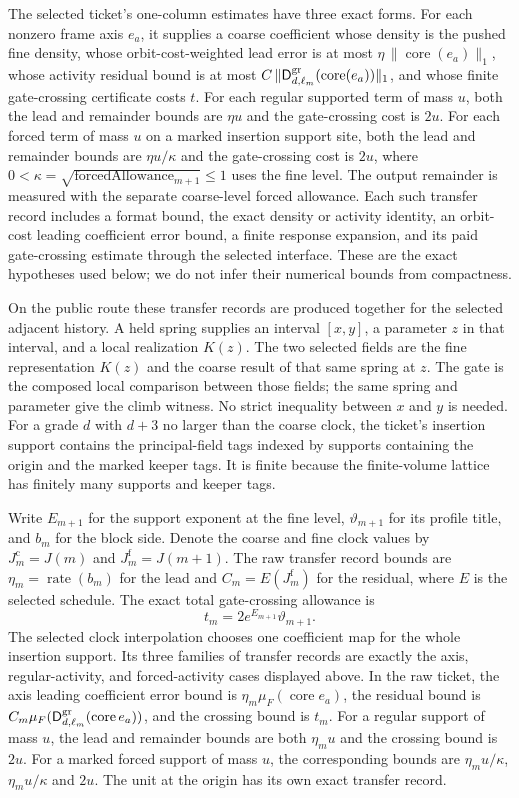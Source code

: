 The selected ticket's one-column estimates have three exact forms. For each nonzero frame axis $e_a$, it supplies a coarse coefficient whose density is the pushed fine density, whose orbit-cost-weighted lead error is at most $\eta\,\|\operatorname{core}(e_a)\|_1$, whose activity residual bound is at most $C\,\|\mathsf D^{\rm gr}_{d,\ell_m}(\operatorname{core}(e_a))\|_1$, and whose finite gate-crossing certificate costs $t$. For each regular supported term of mass $u$, both the lead and remainder bounds are $\eta u$ and the gate-crossing cost is $2u$. For each forced term of mass $u$ on a marked insertion support site, both the lead and remainder bounds are $\eta u/\kappa$ and the gate-crossing cost is $2u$, where $0<\kappa=\sqrt{\text{forcedAllowance}_{m+1}}\leq1$ uses the fine level. The output remainder is measured with the separate coarse-level forced allowance. Each such transfer record includes a format bound, the exact density or activity identity, an orbit-cost leading coefficient error bound, a finite response expansion, and its paid gate-crossing estimate through the selected interface. These are the exact hypotheses used below; we do not infer their numerical bounds from compactness.

On the public route these transfer records are produced together for the selected adjacent history. A held spring supplies an interval $[x,y]$, a parameter $z$ in that interval, and a local realization $K(z)$. The two selected fields are the fine representation $K(z)$ and the coarse result of that same spring at $z$. The gate is the composed local comparison between those fields; the same spring and parameter give the climb witness. No strict inequality between $x$ and $y$ is needed. For a grade $d$ with $d+3$ no larger than the coarse clock, the ticket's insertion support contains the principal-field tags indexed by supports containing the origin and the marked keeper tags. It is finite because the finite-volume lattice has finitely many supports and keeper tags.

Write $E_{m+1}$ for the support exponent at the fine level, $\vartheta_{m+1}$ for its profile title, and $b_m$ for the block side. Denote the coarse and fine clock values by $J_m^{\mathrm c}=J(m)$ and $J_m^{\mathrm f}=J(m+1)$. The raw transfer record bounds are $\eta_m=\operatorname{rate}(b_m)$ for the lead and $C_m=E(J_m^{\mathrm f})$ for the residual, where $E$ is the selected schedule. The exact total gate-crossing allowance is
\[
 t_m=2e^{E_{m+1}}\vartheta_{m+1}.
\]
The selected clock interpolation chooses one coefficient map for the whole insertion support. Its three families of transfer records are exactly the axis, regular-activity, and forced-activity cases displayed above. In the raw ticket, the axis leading coefficient error bound is $\eta_m\mu_F(\operatorname{core}e_a)$, the residual bound is $C_m\mu_F(\mathsf D^{\rm gr}_{d,\ell_m}(\operatorname{core}e_a))$, and the crossing bound is $t_m$. For a regular support of mass $u$, the lead and remainder bounds are both $\eta_m u$ and the crossing bound is $2u$. For a marked forced support of mass $u$, the corresponding bounds are $\eta_m u/\kappa$, $\eta_m u/\kappa$ and $2u$. The unit at the origin has its own exact transfer record.

